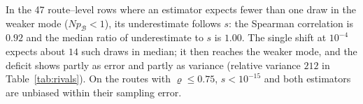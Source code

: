 In the 47 route--level rows where an estimator expects fewer than one draw in the weaker mode ($Np_{\mathcal B}<1$), its underestimate follows $s$: the Spearman correlation is $0.92$ and the median ratio of underestimate to $s$ is $1.00$. The single shift at $10^{-4}$ expects about $14$ such draws in median; it then reaches the weaker mode, and the deficit shows partly as error and partly as variance (relative variance $212$ in Table~\ref{tab:rivals}). On the routes with $\varrho\le0.75$, $s<10^{-15}$ and both estimators are unbiased within their sampling error.
